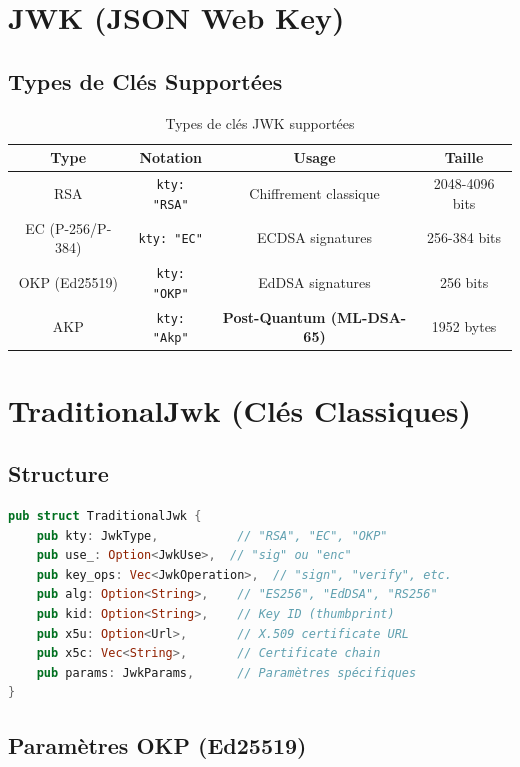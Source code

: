 \documentclass[12pt,a4paper]{report}
\begin{document}
\section{JWK (JSON Web Key)}

\subsection{Types de Clés Supportées}

\begin{table}[H]
\centering
\begin{tabular}{|c|c|c|c|}
\hline
\textbf{Type} & \textbf{Notation} & \textbf{Usage} & \textbf{Taille} \\
\hline
RSA & \texttt{kty: "RSA"} & Chiffrement classique & 2048-4096 bits \\
\hline
EC (P-256/P-384) & \texttt{kty: "EC"} & ECDSA signatures & 256-384 bits \\
\hline
OKP (Ed25519) & \texttt{kty: "OKP"} & EdDSA signatures & 256 bits \\
\hline
AKP & \texttt{kty: "Akp"} & \textbf{Post-Quantum (ML-DSA-65)} & 1952 bytes \\
\hline
\end{tabular}
\caption{Types de clés JWK supportées}
\end{table}

\section{TraditionalJwk (Clés Classiques)}

\subsection{Structure}

\begin{lstlisting}[language=Rust]
pub struct TraditionalJwk {
    pub kty: JwkType,           // "RSA", "EC", "OKP"
    pub use_: Option<JwkUse>,  // "sig" ou "enc"
    pub key_ops: Vec<JwkOperation>,  // "sign", "verify", etc.
    pub alg: Option<String>,    // "ES256", "EdDSA", "RS256"
    pub kid: Option<String>,    // Key ID (thumbprint)
    pub x5u: Option<Url>,       // X.509 certificate URL
    pub x5c: Vec<String>,       // Certificate chain
    pub params: JwkParams,      // Paramètres spécifiques
}
\end{lstlisting}

\subsection{Paramètres OKP (Ed25519)}
\end{document}
